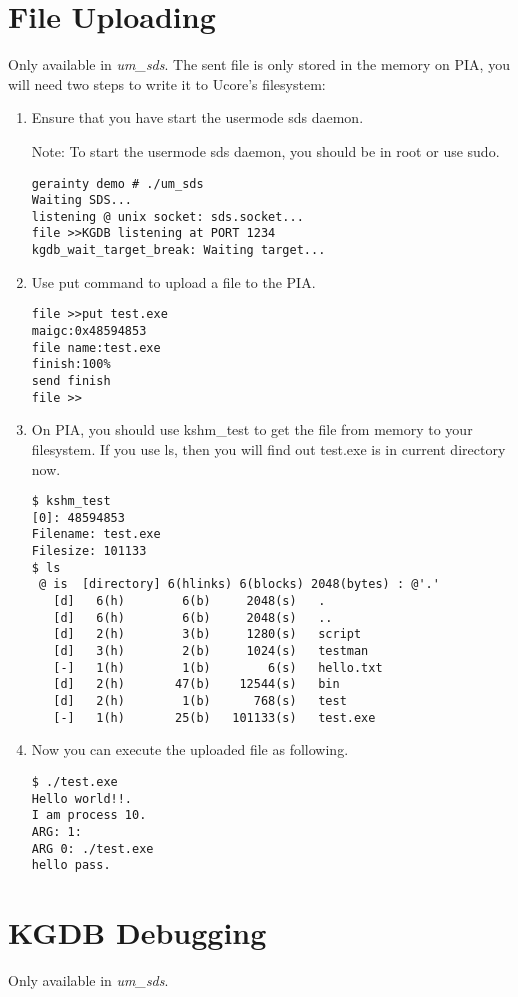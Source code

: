 \documentclass[a4paper]{article}
\begin{document}
\section{File Uploading}
Only available in \emph{um\_sds}. The sent file is only stored
in the memory on PIA, you will need two steps to write it to
Ucore's filesystem:
\begin{enumerate}
\item Ensure that you have start the usermode sds daemon.

Note: To start the usermode sds daemon, you should be in root or use sudo.
\begin{verbatim}
gerainty demo # ./um_sds 
Waiting SDS...
listening @ unix socket: sds.socket...
file >>KGDB listening at PORT 1234
kgdb_wait_target_break: Waiting target...
\end{verbatim}

\item Use put command to upload a file to the PIA.
\begin{verbatim}
file >>put test.exe
maigc:0x48594853
file name:test.exe
finish:100%
send finish
file >>
\end{verbatim}


\item On PIA, you should use kshm\_test to get the file from memory to your filesystem. If you use ls, then you will find out test.exe is in current directory now.
\begin{verbatim}
$ kshm_test
[0]: 48594853
Filename: test.exe
Filesize: 101133
$ ls 
 @ is  [directory] 6(hlinks) 6(blocks) 2048(bytes) : @'.'
   [d]   6(h)        6(b)     2048(s)   .
   [d]   6(h)        6(b)     2048(s)   ..
   [d]   2(h)        3(b)     1280(s)   script
   [d]   3(h)        2(b)     1024(s)   testman
   [-]   1(h)        1(b)        6(s)   hello.txt
   [d]   2(h)       47(b)    12544(s)   bin
   [d]   2(h)        1(b)      768(s)   test
   [-]   1(h)       25(b)   101133(s)   test.exe

\end{verbatim}

\item Now you can execute the uploaded file as following.
\begin{verbatim}
$ ./test.exe
Hello world!!.
I am process 10.
ARG: 1:
ARG 0: ./test.exe
hello pass.
\end{verbatim}
\end{enumerate}

\section{KGDB Debugging}
Only available in \emph{um\_sds}. 
\end{document}
